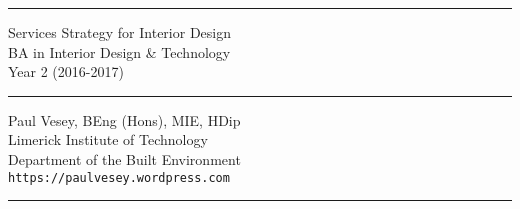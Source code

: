 
\thispagestyle{empty} %


\hrule

\vspace*{0.7cm} %


\begin{flushright}
\Huge Services Strategy for Interior Design \\
\vspace*{0.7cm}
\Large BA in Interior Design & Technology\\
Year 2 (2016-2017)
\end{flushright}

\vspace*{0.7cm} %
	
\normalsize

\hrule


\vfill %


{\centering \large 
\hfill Paul Vesey, \scriptsize BEng (Hons), MIE, HDip\normalsize \\
\hfill Limerick Institute of Technology \\
\hfill Department of the Built Environment \\
\hfill \texttt{https://paulvesey.wordpress.com} \\
\vspace*{0.7cm} 
\hrule} %


\clearpage %
